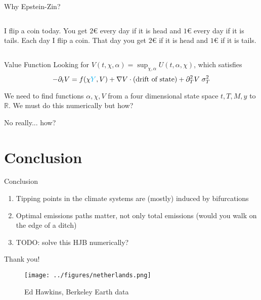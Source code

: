 \documentclass[pdf]{beamer}
\begin{document}
\begin{frame}{Why Epstein-Zin?}
    \begin{columns}
        I flip a coin today. You get $2$€ every day if it is head and $1$€ every day if it is tails.
        Each day I flip a coin. That day you get $2$€ if it is head and $1$€ if it is tails.
    \end{columns}
\end{frame}

\begin{frame}{Value Function}
    Looking for $V(t, \chi, \alpha) = \sup_{\chi, \alpha} U(t, \alpha, \chi)$, which satisfies
    \begin{equation*}
        -\partial_t V = f(\chi {\color{cyan} Y}, V) + \nabla V \cdot (\text{drift of state}) + \partial^2_T V \; \sigma^2_T
    \end{equation*}
\end{frame}


\begin{frame}
    We need to find functions $\alpha, \chi, V$ from a four dimensional state space $t, T, M, y$ to $\mathbb{R}$. We must do this numerically but how?
    
    \hspace{2em}

    \pause No really... how?
\end{frame}

\section{Conclusion}
\begin{frame}{Conclusion}
    \begin{enumerate}
        \item Tipping points in the climate systems are (mostly) induced by bifurcations
        \pause \item Optimal emissions paths matter, not only total emissions (would you walk on the edge of a ditch)
        \pause \item TODO: solve this HJB numerically?  
    \end{enumerate}
\end{frame}

\begin{frame}{Thank you!}
    \centering
    \begin{figure}
        \texttt{[image: ../figures/netherlands.png]}
        \caption{Ed Hawkins, Berkeley Earth data}
    \end{figure}
\end{frame}
\end{document}
